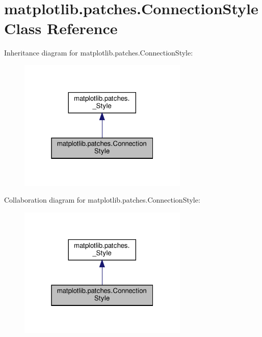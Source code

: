 \hypertarget{classmatplotlib_1_1patches_1_1ConnectionStyle}{}\section{matplotlib.\+patches.\+Connection\+Style Class Reference}
\label{classmatplotlib_1_1patches_1_1ConnectionStyle}


Inheritance diagram for matplotlib.\+patches.\+Connection\+Style\+:
\nopagebreak
\begin{figure}[H]
\begin{center}
\leavevmode
\includegraphics[width=229pt]{classmatplotlib_1_1patches_1_1ConnectionStyle__inherit__graph}
\end{center}
\end{figure}


Collaboration diagram for matplotlib.\+patches.\+Connection\+Style\+:
\nopagebreak
\begin{figure}[H]
\begin{center}
\leavevmode
\includegraphics[width=229pt]{classmatplotlib_1_1patches_1_1ConnectionStyle__coll__graph}
\end{center}
\end{figure}
